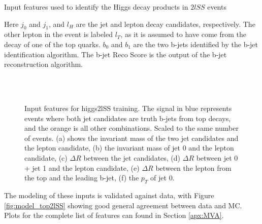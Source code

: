 \begin{table}[H]

\caption{Input features used to identify the Higgs decay products in $2lSS$ events}
\label{tab:higgsTop2lSSfeatures}
\end{table}

Here $j_0$ and $j_1$, and $l_H$ are the jet and lepton decay candidates, respectively. The other lepton in the event is labeled $l_T$, as it is assumed to have come from the decay of one of the top quarks. $b_0$ and $b_1$ are the two b-jets identified by the b-jet identification algorithm. The b-jet Reco Score is the output of the b-jet reconstruction algorithm.

\begin{figure}[H]
    \centering
    \\
    \\
    \caption{Input features for higgs2lSS training. The signal in blue represents events where both jet candidates are truth b-jets from top decays, and the orange is all other combinations. Scaled to the same number of events. (a) shows the invariant mass of the two jet candidates and the lepton candidate, (b) the invariant mass of jet 0 and the lepton candidate, (c) $\Delta R$ between the jet candidates, (d) $\Delta R$ between jet 0 + jet 1 and the lepton candidate, (e) $\Delta R$ between the lepton from the top and the leading b-jet, (f) the $p_T$ of jet 0.}
    \label{fig:features_higgs2lSS}
\end{figure}

The modeling of these inputs is validated against data, with Figure \ref{fig:model_top2lSS} showing good general agreement between data and MC. Plots for the complete list of features can found in Section \ref{apx:MVA}.

